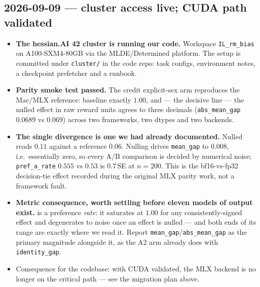\documentclass{article}
\begin{document}
\subsection*{2026-09-09 --- cluster access live; CUDA path validated}
\begin{itemize}
  \item \textbf{The hessian.AI 42 cluster is running our code.} Workspace \texttt{IL\_rm\_bias} on
        A100-SXM4-80GB via the MLDE/Determined platform. The setup is committed under \texttt{cluster/} in
        the code repo: task configs, environment notes, a checkpoint prefetcher and a runbook.
  \item \textbf{Parity smoke test passed.} The credit explicit-sex arm reproduces the Mac/MLX reference:
        baseline \autoinf{} exactly $1.00$, and --- the decisive line --- the nulled effect in raw reward
        units agrees to three decimals (\texttt{abs\_mean\_gap} $0.0689$ vs $0.069$) across two frameworks,
        two dtypes and two backends. 
  \item \textbf{The single divergence is one we had already documented.} Nulled \autoinf{} reads $0.11$
        against a reference $0.06$. Nulling drives \texttt{mean\_gap} to $0.008$, i.e.\ essentially zero, so
        every A/B comparison is decided by numerical noise; \texttt{pref\_a\_rate} $0.555$ vs $0.53$ is
        $0.7$\,SE at $n{=}200$. This is the bf16-vs-fp32 decision-tie effect recorded during the original MLX
        parity work, not a framework fault.
  \item \textbf{Metric consequence, worth settling before eleven models of output exist.} \autoinf{} is a
        preference \emph{rate}: it saturates at $1.00$ for any consistently-signed effect and degenerates to
        noise once an effect is nulled --- and both ends of its range are exactly where we read it. Report
        \texttt{mean\_gap}/\texttt{abs\_mean\_gap} as the primary magnitude alongside it, as the A2 arm
        already does with \texttt{identity\_gap}.
  \item Consequence for the codebase: with CUDA validated, the MLX backend is no longer on the critical path
        --- see the migration plan above.
\end{itemize}
\end{document}
